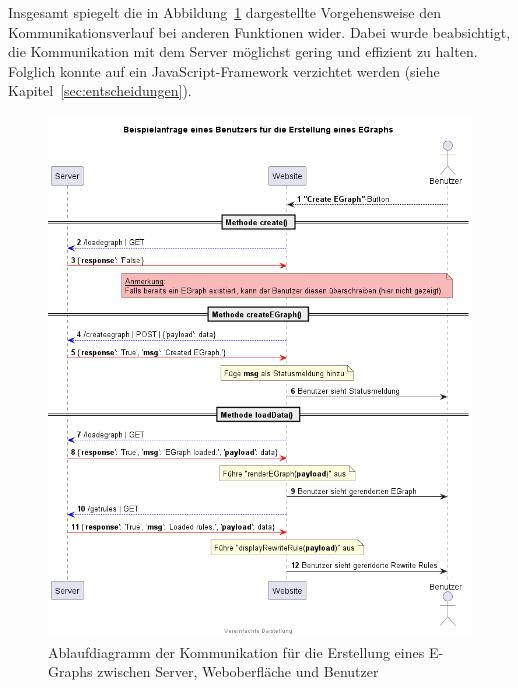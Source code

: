 
Insgesamt spiegelt die in Abbildung~\ref{fig:ablauf} dargestellte Vorgehensweise den Kommunikationsverlauf bei anderen Funktionen wider.
Dabei wurde beabsichtigt, die Kommunikation mit dem Server möglichst gering und effizient zu halten. Folglich konnte auf ein JavaScript-Framework verzichtet werden (siehe Kapitel~\ref{sec:entscheidungen}).

\begin{figure}[H]
  \centering
  \includegraphics[scale=0.6]{../fig/query.png}
  \caption{Ablaufdiagramm der Kommunikation für die Erstellung eines E-Graphs zwischen Server, Weboberfläche und Benutzer}
  \label{fig:ablauf}
\end{figure}
